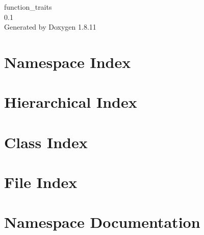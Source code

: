\documentclass[twoside]{book}
\newcommand{\+}{\discretionary{\mbox{\scriptsize$\hookleftarrow$}}{}{}}
\newcommand{\clearemptydoublepage}{%
  \newpage{\pagestyle{empty}\cleardoublepage}%
}
\begin{document}
\hypersetup{pageanchor=false,
             bookmarksnumbered=true,
             pdfencoding=unicode
            }
\begin{titlepage}
\vspace*{7cm}
\begin{center}%
{\Large function\+\_\+traits \\[1ex]\large 0.\+1 }\\
\vspace*{1cm}
{\large Generated by Doxygen 1.8.11}\\
\end{center}
\end{titlepage}
\clearemptydoublepage
\tableofcontents
\clearemptydoublepage
{}
\hypersetup{pageanchor=true}

\chapter{Namespace Index}

\chapter{Hierarchical Index}

\chapter{Class Index}

\chapter{File Index}

\chapter{Namespace Documentation}

\end{document}
